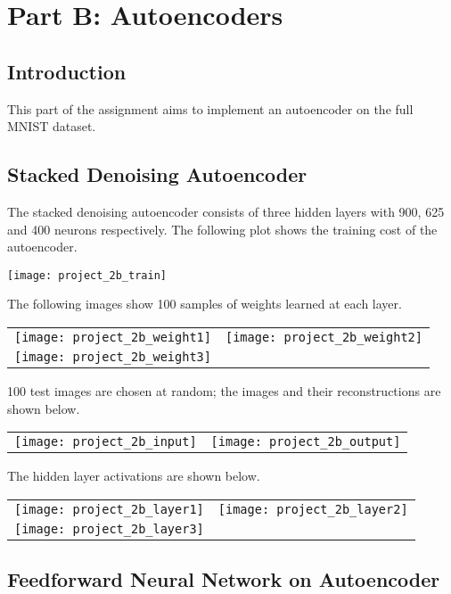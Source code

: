 \chapter*{Part B\@: Autoencoders}

\section*{Introduction}

This part of the assignment aims to implement an autoencoder on the full MNIST
dataset.

\section*{Stacked Denoising Autoencoder}

The stacked denoising autoencoder consists of three hidden layers with 900, 625
and 400 neurons respectively. The following plot shows the training cost of the
autoencoder.

\begin{center}
    \texttt{[image: project\_2b\_train]}
\end{center}

The following images show 100 samples of weights learned at each layer.

\begin{longtabu}{X[c]X[c]}
    \texttt{[image: project\_2b\_weight1]} &
    \texttt{[image: project\_2b\_weight2]} \\
    \texttt{[image: project\_2b\_weight3]}
\end{longtabu}

100 test images are chosen at random; the images and their reconstructions are
shown below.

\begin{longtabu}{X[c]X[c]}
    \texttt{[image: project\_2b\_input]} &
    \texttt{[image: project\_2b\_output]}
\end{longtabu}

The hidden layer activations are shown below.

\begin{longtabu}{X[c]X[c]}
    \texttt{[image: project\_2b\_layer1]} &
    \texttt{[image: project\_2b\_layer2]} \\
    \texttt{[image: project\_2b\_layer3]}
\end{longtabu}

\section*{Feedforward Neural Network on Autoencoder}

